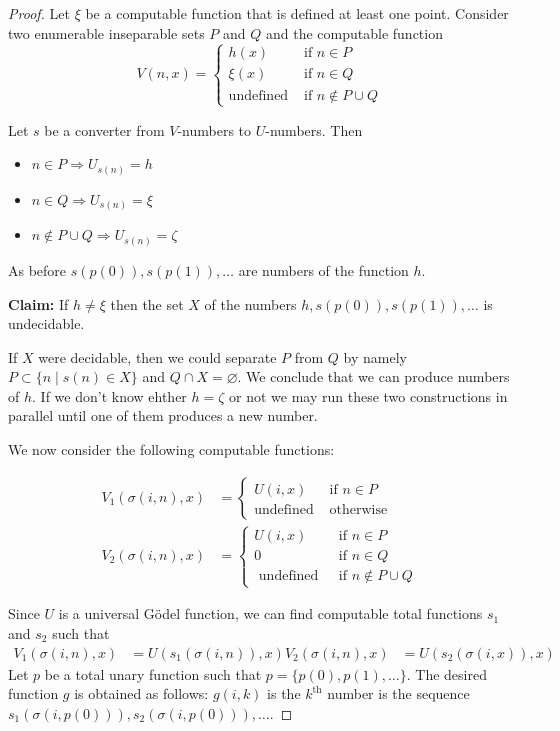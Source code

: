 \documentclass[10pt, letterpaper]{article}
\theoremstyle{remark}
\theoremstyle{definition}
\begin{document}
\begin{proof}
    Let $\xi$ be a computable function that is defined at least one point. Consider two enumerable inseparable sets $P$ and $Q$ and the computable 
    function 
    \[
        V(n,x) = \begin{cases}
            h(x) &\text{ if } n \in P \\
            \xi(x) &\text{ if } n \in Q \\
            \text{undefined} &\text{ if } n \notin P \cup Q
        \end{cases}
    \]

    Let $s$ be a converter from $V$-numbers to $U$-numbers. Then 
    \begin{itemize}
        \item $n \in P \Rightarrow U_{s(n)} = h$
        \item $n \in Q \Rightarrow U_{s(n)} = \xi$
        \item $n \notin P \cup Q \Rightarrow U_{s(n)} = \zeta$
    \end{itemize}
    As before $s(p(0)), s(p(1)), \ldots$ are numbers of the function $h$.

    \textbf{Claim: } If $h \neq \xi$ then the set $X$ of the numbers $h, s(p(0)), s(p(1)), \ldots$ is undecidable.

    If $X$ were decidable, then we could separate $P$ from $Q$ by namely $P \subset \{n \mid s(n) \in X\}$ and $Q \cap X = \varnothing$.
    We conclude that we can produce numbers of $h$. If we don't know ehther $h = \zeta$ or not we may run these two 
    constructions in parallel until one of them produces a new number.

    We now consider the following computable functions:

    \begin{align*}
        V_1(\sigma(i,n),x) & = \begin{cases}
            U(i,x) &\text{ if } n \in P \\
            \text{undefined} &\text{ otherwise}
        \end{cases} \\
        V_2(\sigma(i,n),x) &= \begin{cases}
            U(i,x) &\text{ if } n \in P \\
            0 &\text{ if } n \in Q \\
            \text{ undefined } &\text{ if } n \notin P \cup Q
        \end{cases}
    \end{align*}

    Since $U$ is a universal G\"{o}del function, we can find computable total functions $s_1$ and $s_2$ such that 
    \begin{align*}
        V_1(\sigma(i,n),x) &= U(s_1(\sigma(i,n)),x)
        V_2(\sigma(i,n),x) &= U(s_2(\sigma(i,x)),x)
    \end{align*}
    Let $p$ be a total unary function such that $p = \{p(0), p(1), \ldots\}$. The desired function $g$ is obtained as follows:
    $g(i,k)$ is the $k^{\text{th}}$ number is the sequence $s_1(\sigma(i,p(0))), s_2(\sigma(i,p(0))), \ldots$.
\end{proof}
\end{document}
